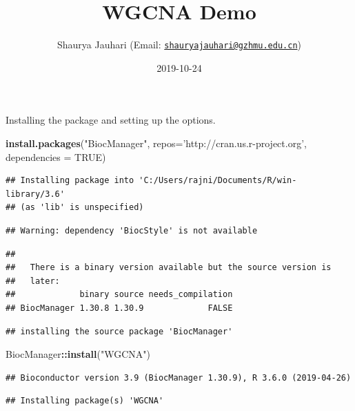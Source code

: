 \documentclass[]{article}
\title{WGCNA Demo}
\author{Shaurya Jauhari (Email:
\href{mailto:shauryajauhari@gzhmu.edu.cn}{\nolinkurl{shauryajauhari@gzhmu.edu.cn}})}
\date{2019-10-24}
\newenvironment{Shaded}{\begin{snugshade}}{\end{snugshade}}
\newcommand{\DataTypeTok}[1]{\textcolor[rgb]{0.13,0.29,0.53}{#1}}
\newcommand{\KeywordTok}[1]{\textcolor[rgb]{0.13,0.29,0.53}{\textbf{#1}}}
\newcommand{\NormalTok}[1]{#1}
\newcommand{\OperatorTok}[1]{\textcolor[rgb]{0.81,0.36,0.00}{\textbf{#1}}}
\newcommand{\OtherTok}[1]{\textcolor[rgb]{0.56,0.35,0.01}{#1}}
\newcommand{\StringTok}[1]{\textcolor[rgb]{0.31,0.60,0.02}{#1}}
\begin{document}
\maketitle

Installing the package and setting up the options.

\begin{Shaded}
\begin{Highlighting}[]
\KeywordTok{install.packages}\NormalTok{(}\StringTok{"BiocManager"}\NormalTok{, }
                 \DataTypeTok{repos=}\StringTok{'http://cran.us.r-project.org'}\NormalTok{,}
                 \DataTypeTok{dependencies =} \OtherTok{TRUE}\NormalTok{)}
\end{Highlighting}
\end{Shaded}

\begin{verbatim}
## Installing package into 'C:/Users/rajni/Documents/R/win-library/3.6'
## (as 'lib' is unspecified)
\end{verbatim}

\begin{verbatim}
## Warning: dependency 'BiocStyle' is not available
\end{verbatim}

\begin{verbatim}
## 
##   There is a binary version available but the source version is
##   later:
##             binary source needs_compilation
## BiocManager 1.30.8 1.30.9             FALSE
\end{verbatim}

\begin{verbatim}
## installing the source package 'BiocManager'
\end{verbatim}

\begin{Shaded}
\begin{Highlighting}[]
\NormalTok{BiocManager}\OperatorTok{::}\KeywordTok{install}\NormalTok{(}\StringTok{"WGCNA"}\NormalTok{)}
\end{Highlighting}
\end{Shaded}

\begin{verbatim}
## Bioconductor version 3.9 (BiocManager 1.30.9), R 3.6.0 (2019-04-26)
\end{verbatim}

\begin{verbatim}
## Installing package(s) 'WGCNA'
\end{verbatim}
\end{document}
